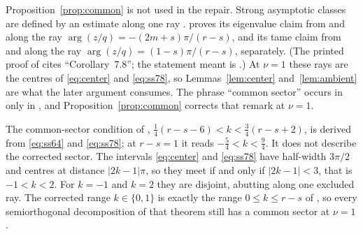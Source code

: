\begin{remark}
  \label{rem:uniqueness}
  Proposition~\ref{prop:common} is not used in the repair.  Strong
  asymptotic classes are defined by an estimate along one ray
  \cite[Definition~1.3]{SS}.  \cite[Proposition~9.2]{SS} proves its
  eigenvalue claim from \cite[Proposition~9.1]{SS} and
  \cite[Proposition~7.8]{SS} along the ray
  \(\arg(z/q)=-(2m+s)\pi/(r-s)\), and its tame claim from
  \cite[Proposition~9.1]{SS} and \cite[Corollary~8.4]{SS} along the ray
  \(\arg(z/q)=(1-s)\pi/(r-s)\), separately.  (The printed proof of
  \cite[Proposition~9.2]{SS} cites ``Corollary~7.8''; the statement meant is
  \cite[Proposition~7.8]{SS}.)  At \(\nu=1\) these rays are the centres of
  \eqref{eq:center} and \eqref{eq:ss78}, so Lemmas~\ref{lem:center}
  and~\ref{lem:ambient} are what the later argument consumes.  The phrase
  ``common sector'' occurs in \cite{SS} only in \cite[Remark~1.6]{SS}, and
  Proposition~\ref{prop:common} corrects that remark at \(\nu=1\).

  The common-sector condition of \cite[Remark~1.6]{SS},
  \(\tfrac14(r-s-6)<k<\tfrac34(r-s+2)\), is derived from \eqref{eq:ss64} and
  \eqref{eq:ss78}; at \(r-s=1\) it reads \(-\tfrac54<k<\tfrac94\).  It does not
  describe the corrected sector.  The intervals \eqref{eq:center} and
  \eqref{eq:ss78} have half-width \(3\pi/2\) and centres at distance
  \(|2k-1|\pi\), so they meet if and only if \(|2k-1|<3\), that is
  \(-1<k<2\).  For \(k=-1\) and \(k=2\) they are disjoint, abutting along one
  excluded ray.  The corrected range \(k\in\{0,1\}\) is exactly the range
  \(0\le k\le r-s\) of \cite[Theorem~1.1]{SS}, so every semiorthogonal
  decomposition of that theorem still has a common sector at \(\nu=1\).
\end{remark}
